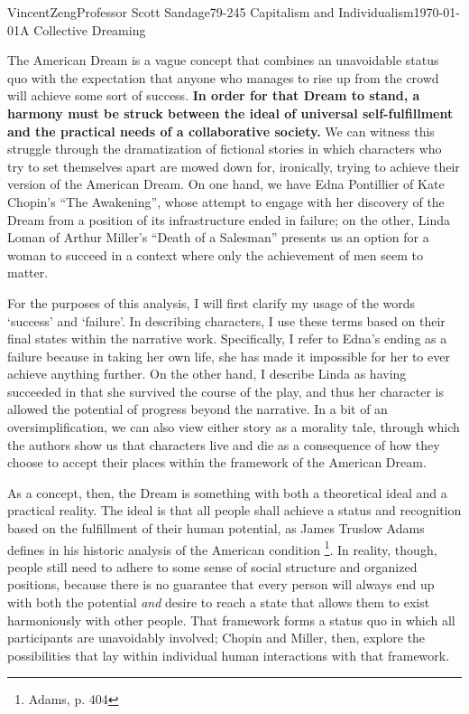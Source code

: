 \documentclass[12pt]{article}
\begin{document}
\begin{mla}{Vincent}{Zeng}{Professor Scott Sandage}{79-245 Capitalism and Individualism}{\today}{A Collective Dreaming}

The American Dream is a vague concept that combines an unavoidable
status quo with the expectation that anyone who manages to rise 
up from the crowd will achieve some sort of success. \textbf{In order for that Dream
to stand, a harmony must be struck between the ideal of universal
self-fulfillment and the practical needs of a collaborative society.}  We can
witness this struggle through the dramatization of fictional stories in which
characters who try to set themselves apart are mowed down for, ironically,
trying to achieve their version of the American Dream.  On one hand, we have
Edna Pontillier of Kate Chopin's ``The Awakening'', whose attempt to engage
with her discovery of the Dream from a position of its infrastructure ended in
failure; on the other, Linda Loman of Arthur Miller's ``Death of a Salesman''
presents us an option for a woman to succeed in a context where only the
achievement of men seem to matter.

For the purposes of this analysis, I will first clarify my usage of the words
`success' and `failure'.  In describing characters, I use these terms based on
their final states within the narrative work.  Specifically, I refer to Edna's
ending as a failure because in taking her own life, she has made it impossible
for her to ever achieve anything further.  On the other hand, I describe Linda
as having succeeded in that she survived the course of the play, and thus
her character is allowed the potential of progress beyond the narrative.  In a bit of
an oversimplification, we can also view either story as a morality tale,
through which the authors show us that characters live and die as a
consequence of how they choose to accept their places within the framework of
the American Dream.

As a concept, then, the Dream is something with both a theoretical ideal and a
practical reality.  The ideal is that all people shall achieve a status and
recognition based on the fulfillment of their human potential, as James Truslow
Adams defines in his historic analysis of the American condition
\footnote{Adams, p. 404}.  In reality, though, people still need to adhere to
some sense of social structure and organized positions, because there is no
guarantee that every person will always end up with both the potential
\textit{and}
desire to reach a state that allows them to exist harmoniously with other
people.  That framework forms a status quo in which all participants are
unavoidably involved; Chopin and Miller, then, explore the possibilities that
lay within individual human interactions with that framework.


\end{mla}
\end{document}
